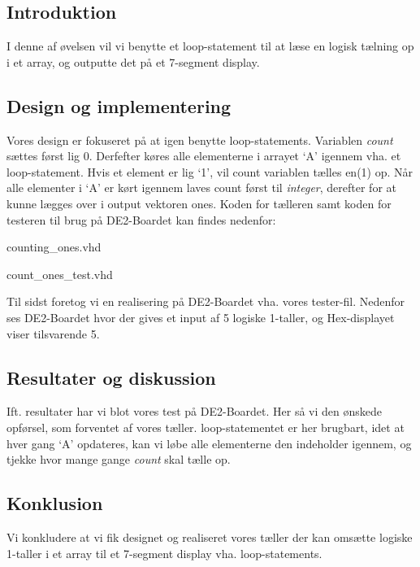 \documentclass[../journal.tex]{subfiles}
\begin{document}
\subsection{Introduktion}
I denne af øvelsen vil vi benytte et loop-statement til at læse en logisk tælning op i et array, og outputte det på et 7-segment display.

\subsection{Design og implementering}
Vores design er fokuseret på at igen benytte loop-statements. Variablen \textit{count} sættes først lig 0. Derfefter køres alle elementerne i arrayet `A' igennem vha. et loop-statement. Hvis et element er lig `1', vil count variablen tælles en(1) op. Når alle elementer i `A' er kørt igennem laves count først til \textit{integer}, derefter  for at kunne lægges over i output vektoren ones. Koden for tælleren samt koden for testeren til brug på DE2-Boardet kan findes nedenfor:

\begin{table}[H]
    \centering
      \framebox{
        \rule{8pt}{0pt}
          
  }
  \caption{counting\_ones.vhd}	
  \label{src:TabCon}
\end{table}

\begin{table}[H]
    \centering
      \framebox{
        \rule{8pt}{0pt}
          
  }
  \caption{count\_ones\_test.vhd}	
  \label{src:TabConTest}
\end{table}

Til sidst foretog vi en realisering på DE2-Boardet vha. vores tester-fil. Nedenfor ses DE2-Boardet hvor der gives et input af 5 logiske 1-taller, og Hex-displayet viser tilsvarende 5.

\subsection{Resultater og diskussion}
Ift. resultater har vi blot vores test på DE2-Boardet. Her så vi den ønskede opførsel, som forventet af vores tæller. loop-statementet er her brugbart, idet at hver gang `A' opdateres, kan vi løbe alle elementerne den indeholder igennem, og tjekke hvor mange gange \textit{count} skal tælle op.

\subsection{Konklusion}
Vi konkludere at vi fik designet og realiseret vores tæller der kan omsætte logiske 1-taller i et array til et 7-segment display vha. loop-statements.
\end{document}
